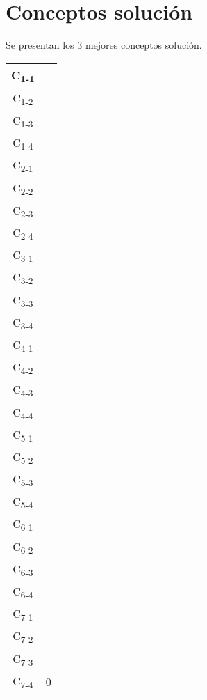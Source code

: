 \section{Conceptos soluci\'on}
%
Se presentan los 3 mejores conceptos soluci\'on.
\begin{center}
  \tablelasttail{\hline}
  
\begin{supertabular}{|c|c|}
\hline

C\textsubscript{1-1} & \\\hline
C\textsubscript{1-2} & \\\hline
C\textsubscript{1-3} & \\\hline
C\textsubscript{1-4} & \\\hline
C\textsubscript{2-1} & \\\hline
C\textsubscript{2-2} & \\\hline
C\textsubscript{2-3} & \\\hline
C\textsubscript{2-4} & \\\hline
C\textsubscript{3-1} & \\\hline
C\textsubscript{3-2} & \\\hline
C\textsubscript{3-3} & \\\hline
C\textsubscript{3-4} & \\\hline
C\textsubscript{4-1} & \\\hline
C\textsubscript{4-2} & \\\hline
C\textsubscript{4-3} & \\\hline
C\textsubscript{4-4} & \\\hline
C\textsubscript{5-1} & \\\hline
C\textsubscript{5-2} & \\\hline
C\textsubscript{5-3} & \\\hline
C\textsubscript{5-4} & \\\hline
C\textsubscript{6-1} & \\\hline
C\textsubscript{6-2} & \\\hline
C\textsubscript{6-3} & \\\hline
C\textsubscript{6-4} & \\\hline
C\textsubscript{7-1} & \\\hline
C\textsubscript{7-2} & \\\hline
C\textsubscript{7-3} & \\\hline
C\textsubscript{7-4} & 0\\
 
\end{supertabular}
\end{center}